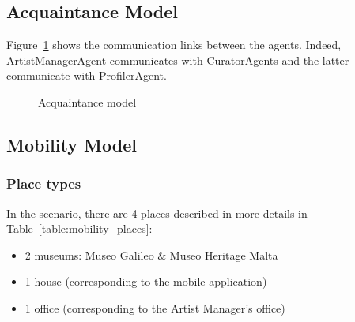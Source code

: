 \documentclass[a4paper,11pt]{report}
\begin{document}
  
  
  \subsection{Acquaintance Model}
  
  Figure~\ref{figure:acquaintance_model} shows the communication links between the agents. 
  Indeed, ArtistManagerAgent communicates with CuratorAgents and the latter communicate with 
  ProfilerAgent.
  
  \begin{figure}[ht!]
\caption{Acquaintance model}
\label{figure:acquaintance_model}
\end{figure}
  
  \subsection{Mobility Model}
  

  \subsubsection{Place types}
    In the scenario, there are 4 places described in more details in Table~\ref{table:mobility_places}:
  \begin{itemize}
   \item 2 museums: Museo Galileo \& Museo Heritage Malta
   \item 1 house (corresponding to the mobile application)
   \item 1 office (corresponding to the Artist Manager's office)
  \end{itemize}
  
\end{document}
